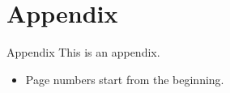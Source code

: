 \section{Appendix}

\begin{frame}{Appendix}
    This is an appendix.
    \begin{itemize}
        \item Page numbers start from the beginning.
    \end{itemize}
\end{frame}
